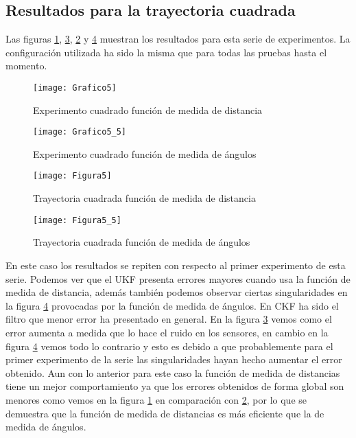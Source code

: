 \subsection{Resultados para la trayectoria cuadrada}
Las figuras \ref{Grafico5}, \ref{Figura5}, \ref{Grafico5_5} y \ref{Figura5_5} muestran los resultados para esta serie de experimentos.
La configuración utilizada ha sido la misma que para todas las pruebas hasta el momento.
\begin{figure}[ht!]
\centering
\texttt{[image: Grafico5]}
\caption{Experimento cuadrado función de medida de distancia} \label{Grafico5}
\end{figure}
\begin{figure}[ht!]
\centering
\texttt{[image: Grafico5\_5]}
\caption{Experimento cuadrado función de medida de ángulos} \label{Grafico5_5}
\end{figure}
\begin{figure}[ht!]
\centering
\texttt{[image: Figura5]}
\caption{Trayectoria cuadrada función de medida de distancia} \label{Figura5}
\end{figure}

\begin{figure}[ht!]
\texttt{[image: Figura5\_5]}
\caption{Trayectoria cuadrada función de medida de ángulos} \label{Figura5_5}
\end{figure}
En este caso los resultados se repiten con respecto al primer experimento de esta serie.
Podemos ver que el \ac{UKF} presenta errores mayores cuando usa la función de medida de distancia, además también podemos observar ciertas singularidades en la figura \ref{Figura5_5} provocadas por la función de medida de ángulos.
En \ac{CKF} ha sido el filtro que menor error ha presentado en general.
En la figura \ref{Figura5} vemos como el error aumenta a medida que lo hace el ruido en los sensores, en cambio en la figura \ref{Figura5_5} vemos todo lo contrario y esto es debido a que probablemente para el primer experimento de la serie las singularidades hayan hecho aumentar el error obtenido.
Aun con lo anterior para este caso la función de medida de distancias tiene un mejor comportamiento ya que los errores obtenidos de forma global son menores como vemos en la figura \ref{Grafico5} en comparación con \ref{Grafico5_5}, por lo que se demuestra que la función de medida de distancias es más eficiente que la de medida de ángulos.
